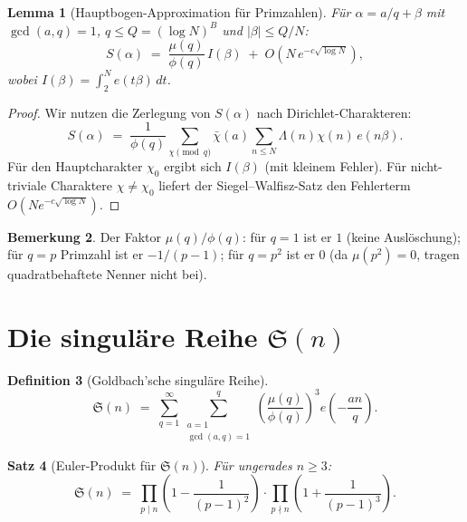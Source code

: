 \documentclass[12pt,a4paper]{amsart}
\newtheorem{theorem}{Satz}[section]
\newtheorem{lemma}[theorem]{Lemma}
\theoremstyle{definition}
\newtheorem{definition}[theorem]{Definition}
\newtheorem{bemerkung}[theorem]{Bemerkung}
\newcommand{\eq}[1]{e\!\left(#1\right)}
\begin{document}
\begin{lemma}[Hauptbogen-Approximation für Primzahlen]\label{lem:approx}
  Für $\alpha = a/q + \beta$ mit $\gcd(a,q)=1$, $q \leq Q = (\log N)^B$
  und $|\beta| \leq Q/N$:
  \[
    S(\alpha) \;=\; \frac{\mu(q)}{\phi(q)}\, I(\beta)
                   \;+\; O\!\left(N\, e^{-c\sqrt{\log N}}\right),
  \]
  wobei $I(\beta) = \int_2^N \eq{t\beta}\, dt$.
\end{lemma}

\begin{proof}
  Wir nutzen die Zerlegung von $S(\alpha)$ nach Dirichlet-Charakteren:
  \[
    S(\alpha) \;=\; \frac{1}{\phi(q)} \sum_{\chi \pmod q}
                   \bar\chi(a) \sum_{n \leq N} \Lambda(n)\chi(n)\, \eq{n\beta}.
  \]
  Für den Hauptcharakter $\chi_0$ ergibt sich $I(\beta)$ (mit kleinem Fehler).
  Für nicht-triviale Charaktere $\chi \neq \chi_0$ liefert der Siegel--Walfisz-Satz
  den Fehlerterm $O(N e^{-c\sqrt{\log N}})$.
\end{proof}

\begin{bemerkung}
  Der Faktor $\mu(q)/\phi(q)$: für $q=1$ ist er $1$ (keine Auslöschung);
  für $q = p$ Primzahl ist er $-1/(p-1)$; für $q = p^2$ ist er $0$
  (da $\mu(p^2) = 0$, tragen quadratbehaftete Nenner nicht bei).
\end{bemerkung}

\section{Die singuläre Reihe \texorpdfstring{$\mathfrak{S}(n)$}{S(n)}}
\label{sec:singulär}

\begin{definition}[Goldbach'sche singuläre Reihe]
  \[
    \mathfrak{S}(n)
    \;=\; \sum_{q=1}^{\infty}
          \sum_{\substack{a=1\\ \gcd(a,q)=1}}^{q}
          \left(\frac{\mu(q)}{\phi(q)}\right)^3 \eq{-\frac{an}{q}}.
  \]
\end{definition}

\begin{theorem}[Euler-Produkt für $\mathfrak{S}(n)$]\label{thm:euler}
  Für ungerades $n \geq 3$:
  \[
    \mathfrak{S}(n)
    \;=\; \prod_{p \mid n} \!\left(1 - \frac{1}{(p-1)^2}\right)
          \cdot \prod_{p \nmid n} \!\left(1 + \frac{1}{(p-1)^3}\right).
  \]
\end{theorem}
\end{document}
